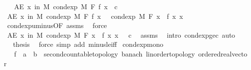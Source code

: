 \begin{isabellebody}
\ \ \ {\isachardoublequoteopen}AE\ x\ in\ M{\isachardot}{\kern0pt}\ cond{\isacharunderscore}{\kern0pt}exp\ M\ F\ f\ x\ {\isasymle}\ c{\isachardoublequoteclose}\isanewline
%
\isadelimproof
%
\endisadelimproof
%
\isatagproof
{}\isamarkupfalse%
\ {\isacharminus}{\kern0pt}\isanewline
\ \ \isamarkupfalse%
\ {\isachardoublequoteopen}AE\ x\ in\ M{\isachardot}{\kern0pt}\ cond{\isacharunderscore}{\kern0pt}exp\ M\ F\ f\ x\ {\isacharequal}{\kern0pt}\ {\isacharminus}{\kern0pt}\ cond{\isacharunderscore}{\kern0pt}exp\ M\ F\ {\isacharparenleft}{\kern0pt}{\isasymlambda}x{\isachardot}{\kern0pt}\ {\isacharminus}{\kern0pt}\ f\ x{\isacharparenright}{\kern0pt}\ x{\isachardoublequoteclose}\ \isamarkupfalse%
\ cond{\isacharunderscore}{\kern0pt}exp{\isacharunderscore}{\kern0pt}uminus{\isacharbrackleft}{\kern0pt}OF\ assms{\isacharparenleft}{\kern0pt}{}{\isacharparenright}{\kern0pt}{\isacharbrackright}{\kern0pt}\ \isamarkupfalse%
\ force\isanewline
\ \ \isamarkupfalse%
\ \isamarkupfalse%
\ {\isachardoublequoteopen}AE\ x\ in\ M{\isachardot}{\kern0pt}\ cond{\isacharunderscore}{\kern0pt}exp\ M\ F\ {\isacharparenleft}{\kern0pt}{\isasymlambda}x{\isachardot}{\kern0pt}\ {\isacharminus}{\kern0pt}\ f\ x{\isacharparenright}{\kern0pt}\ x\ {\isasymge}\ {\isacharminus}{\kern0pt}\ c{\isachardoublequoteclose}\ \isamarkupfalse%
\ assms\ \isamarkupfalse%
\ {\isacharparenleft}{\kern0pt}intro\ cond{\isacharunderscore}{\kern0pt}exp{\isacharunderscore}{\kern0pt}ge{\isacharunderscore}{\kern0pt}c{\isacharparenright}{\kern0pt}\ auto\isanewline
\ \ \isamarkupfalse%
\ \isamarkupfalse%
\ {\isacharquery}{\kern0pt}thesis\ \isamarkupfalse%
\ {\isacharparenleft}{\kern0pt}force\ simp\ add{\isacharcolon}{\kern0pt}\ minus{\isacharunderscore}{\kern0pt}le{\isacharunderscore}{\kern0pt}iff{\isacharparenright}{\kern0pt}\isanewline
{}\isamarkupfalse%
%
\endisatagproof
{\isafoldproof}%
%
\isadelimproof
\isanewline
%
\endisadelimproof
\isanewline
{}\isamarkupfalse%
\ cond{\isacharunderscore}{\kern0pt}exp{\isacharunderscore}{\kern0pt}mono{\isacharcolon}{\kern0pt}\isanewline
\ \ \ f\ {\isacharcolon}{\kern0pt}{\isacharcolon}{\kern0pt}\ {\isachardoublequoteopen}{\isacharprime}{\kern0pt}a\ {\isasymRightarrow}\ {\isacharprime}{\kern0pt}b\ {\isacharcolon}{\kern0pt}{\isacharcolon}{\kern0pt}\ {\isacharbraceleft}{\kern0pt}second{\isacharunderscore}{\kern0pt}countable{\isacharunderscore}{\kern0pt}topology{\isacharcomma}{\kern0pt}\ banach{\isacharcomma}{\kern0pt}\ linorder{\isacharunderscore}{\kern0pt}topology{\isacharcomma}{\kern0pt}\ ordered{\isacharunderscore}{\kern0pt}real{\isacharunderscore}{\kern0pt}vector{\isacharbraceright}{\kern0pt}{\isachardoublequoteclose}\isanewline

\end{isabellebody}
